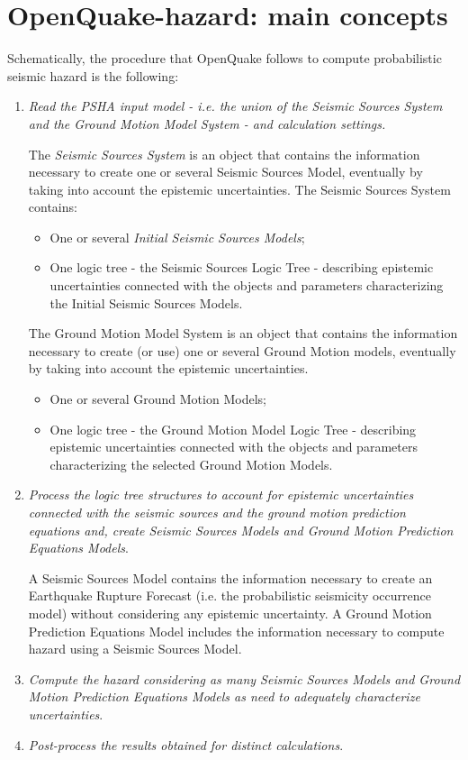 \section{OpenQuake-hazard: main concepts}
Schematically, the procedure that OpenQuake follows to compute probabilistic 
seismic hazard is the following:
%
\begin{enumerate}
%
\item \emph{Read the PSHA input model - i.e. the union of the Seismic Sources 
System and the Ground Motion Model System - and calculation 
settings.}
	
	The \emph{Seismic Sources System} is an object that contains the 
	information necessary to create one or several Seismic Sources Model, 
	eventually by taking into account the epistemic uncertainties. 
	The Seismic Sources System contains:
	\begin{itemize}
	\item One or several \emph{Initial Seismic Sources Models};
	\item One logic tree - the Seismic Sources Logic Tree - describing 
	epistemic uncertainties connected with the objects and parameters 
	characterizing the Initial Seismic Sources Models.
	\end{itemize}
	
	The Ground Motion Model System is an object that contains the information 
	necessary to create (or use) one or several Ground Motion models, eventually 
	by taking into account the epistemic uncertainties. 
	\begin{itemize}
	\item One or several Ground Motion Models;
	\item One logic tree - the Ground Motion Model Logic Tree - 
	describing epistemic uncertainties connected with the objects and 
	parameters characterizing the selected Ground Motion Models.	
	\end{itemize}

%
\item \emph{Process the logic tree structures to account for epistemic 
uncertainties connected with the seismic sources and the ground motion 
prediction equations and, create Seismic Sources Models and Ground Motion 
Prediction Equations Models}.
	
	A Seismic Sources Model contains the information necessary to create an 
	Earthquake Rupture Forecast (i.e. the probabilistic seismicity occurrence
	model) without con\-sid\-er\-ing any epistemic uncertainty.
	A Ground Motion Prediction E\-qua\-tions Model includes the information 
	necessary to compute hazard using a Seismic Sources Model. 
\item \emph{Compute the hazard considering as many Seismic Sources Models and 
Ground Motion Prediction Equations Models as need to adequately characterize 
uncertainties}.
\item \emph{Post-process the results obtained for distinct calculations}.
\end{enumerate}
